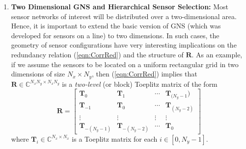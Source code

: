 \begin{enumerate}
\item {\bf Two Dimensional GNS and Hierarchical Sensor Selection:} 
Most sensor networks of interest will be distributed over a two-dimensional area. Hence, it is important to extend the basic version of GNS (which was developed for sensors on a line) to two dimensions. In such cases, the geometry of sensor configurations have very interesting implications on the redundancy relation (\ref{eqn:CorrRed}) and the structure of $\mathbf{R}$. As an example, if we assume the sensors to be located on a uniform rectangular grid in two dimensions of size $N_x\times N_y$, then (\ref{eqn:CorrRed}) implies that $\mathbf{R}\in \mathbb{C}^{N_xN_y\times N_xN_y}$ is a {\em two-level} (or block) Toeplitz matrix of the form 
\begin{equation}
\mathbf{R} = \left[\begin{array}{cccc} \mathbf{T}_0 & \mathbf{T}_1 & \cdots & \mathbf{T}_{(N_y-1}) \\
\mathbf{T}_{-1} & \mathbf{T}_0 & \cdots & \mathbf{T}_{(N_y-2)}\\
\vdots & \vdots & \vdots & \vdots \\
\mathbf{T}_{-(N_y-1)} & \mathbf{T}_{-(N_y-2)} & \cdots & \mathbf{T}_0 \end{array}\right]
\label{eqn:2LevelToep} \end{equation}
where $\mathbf{T}_i\in \mathbb{C}^{N_x\times N_x}$ is a Toeplitz matrix for each $i\in [0,N_y-1]$. 


\end{enumerate}
